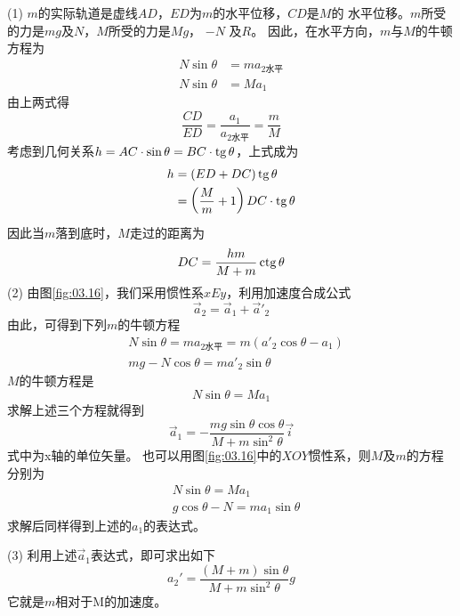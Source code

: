 (1) $ m $的实际轨道是虚线$ AD $，$ ED $为$ m $的水平位移，$ CD $是$ M $的
水平位移。$ m $所受的力是$ mg $及$ N $，$ M $所受的力是$  M g  $， $ - N $ 及$ R $。
因此，在水平方向，$ m $与$ M $的牛顿方程为
\begin{align*}
  N \sin \theta & = m a _ { 2\text{水平} } \\
  N \sin \theta & = M a _ { 1 }
\end{align*}
由上两式得
\begin{equation*}
  \frac { C D } { E D } = \frac { a _ { 1 } } { a _ { 2\text{水平}}} = \frac { m } { M }
\end{equation*}
考虑到几何关系$  h = AC \cdot \sin \theta = BC \cdot \operatorname{tg} \theta  $，上式成为
\begin{align*}
  h & = \left( E D + D C \right) \operatorname{tg} \theta                       \\
    & = \left( \frac { M } { m } + 1 \right) D C \cdot \operatorname{tg} \theta
\end{align*}
因此当$ m $落到底时，$ M $走过的距离为
\begin{equation*}
  D C = \frac { h m } { M + m } \operatorname{ctg} \theta
\end{equation*}
\clearpage
(2) 由图\ref{fig:03.16}，我们采用惯性系$ xEy $，利用加速度合成公式
\begin{equation*}
  \vec{a} _ { 2 } = \vec{a} _ { 1 } + \vec{a}' _ 2
\end{equation*}
由此，可得到下列$ m $的牛顿方程
\begin{align*}
   & N \sin \theta = m a _ { 2\text{水平} }  = m \left( a '_2 \cos \theta - a _ { 1 } \right) \\
   & m g - N \cos \theta = m a' _ { 2 } \sin \theta
\end{align*}
$ M $的牛顿方程是
\begin{equation*}
  N \sin \theta = M a _ { 1 }
\end{equation*}
求解上述三个方程就得到
\begin{equation*}
  \vec{a} _ { 1 } = - \frac { m g \sin \theta \cos \theta} { M + m \sin ^ { 2 } \theta } \vec{i}
\end{equation*}式中为x轴的单位矢量。
也可以用图\ref{fig:03.16}\;中的$ XOY $惯性系，则$ M $及$ m $的方程分别为
\begin{align*}
   & N \sin \theta = M a _ { 1 }                 \\
   & g \cos \theta - N = m a _ { 1 } \sin \theta
\end{align*}
求解后同样得到上述的$ a_1 $的表达式。

(3) 利用上述$\vec{a}_1$表达式，即可求出如下
\begin{equation*}
  a _ 2 ' = \frac { \left( M + m \right) \sin \theta } { M + m \sin ^ { 2 } \theta } g
\end{equation*}
它就是$ m $相对于M的加速度。

